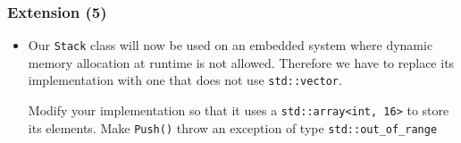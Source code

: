 \documentclass[10pt,aspectratio=169]{beamer}
\begin{document}
\begin{frame}[fragile]
  \frametitle{Extension (5)}
  \begin{itemize}
  \item Our \texttt{Stack} class will now be used on an embedded
    system where dynamic memory allocation at runtime is not allowed.
    Therefore we have to replace its implementation with one that does
    not use \verb!std::vector!.

    Modify your implementation so that it uses a
    \verb|std::array<int, 16>| to store its elements. Make
    \texttt{Push()} throw an exception of type
    \verb!std::out_of_range!
  \end{itemize}
\end{frame}

\end{document}
